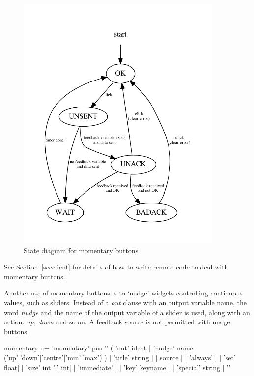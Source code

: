 \begin{figure}[ht]
\center
\includegraphics[width=4in]{stateMomentary.pdf}
\caption{State diagram for momentary buttons}
\label{momstates}
\end{figure}


See Section~\ref{secclient} for details of how to write remote
code to deal with momentary buttons.

Another use of momentary buttons is to `nudge' widgets controlling continuous
values, such as sliders. Instead of a \emph{out} clause with an output
variable name, the word \emph{nudge} and the name of the output variable of a
slider is used, along with an action: \emph{up,} \emph{down} and so on. A
feedback source is not permitted with nudge buttons.
\begin{v}
momentary  ::= 'momentary' pos '{'
                    ( 'out' ident |
                      'nudge' name ('up'|'down'|'centre'|'min'|'max') )
                    [ 'title' string ]
                    [ source ]
                    [ 'always' ]
                    [ 'set' float]
                    [ 'size' int ',' int]
                    [ 'immediate' ]
                    [ 'key' keyname ]
                    [ 'special' string ]
                '}'
\end{v}


